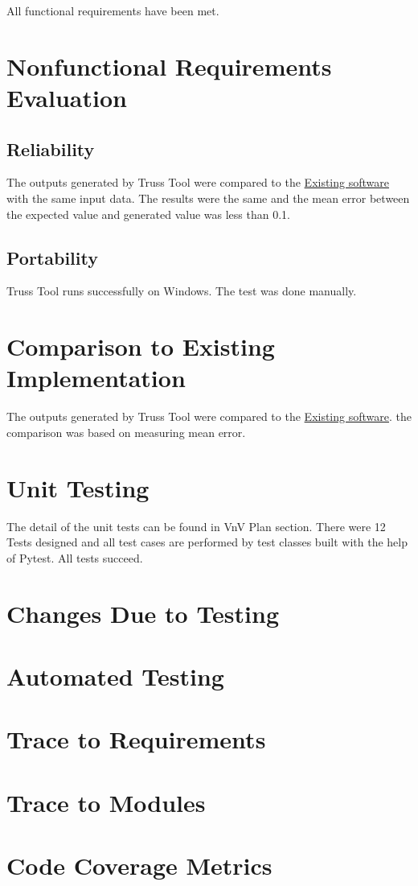 \documentclass[12pt, titlepage]{article}
\begin{document}
All functional requirements have been met.

\section{Nonfunctional Requirements Evaluation}

\subsection{Reliability}
The outputs generated by Truss Tool were compared to the \href{https://valdivia.staff.jade-hs.de/fachwerk_en.html}{Existing software} with the same input data. The results were the same and the mean error between the expected value and generated value was less than 0.1.
		
\subsection{Portability}

Truss Tool runs successfully on Windows. The test was done manually.
	
\section{Comparison to Existing Implementation}	

The outputs generated by Truss Tool were compared to the \href{https://valdivia.staff.jade-hs.de/fachwerk_en.html}{Existing software}. the comparison was based on measuring mean error.

\section{Unit Testing}
The detail of the unit tests can be found in VnV Plan section. There were 12 Tests designed and all test cases are performed by test classes built with the help of Pytest. All tests succeed.

\section{Changes Due to Testing}

\section{Automated Testing}
		
\section{Trace to Requirements}
		
\section{Trace to Modules}		

\section{Code Coverage Metrics}




\newpage{}
\end{document}
